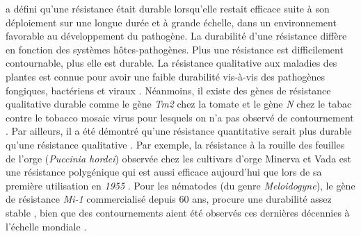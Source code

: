 	\citet{Johnson1984} a défini qu’une résistance était durable lorsqu’elle restait efficace suite à son déploiement sur une longue durée et à grande échelle, dans un environnement favorable au développement
du pathogène. %
La durabilité d’une résistance diffère  en fonction des systèmes hôtes-pathogènes. Plus une résistance est difficilement contournable, plus elle est durable.
La résistance qualitative aux maladies des plantes est connue pour avoir une faible durabilité vis-à-vis des pathogènes fongiques, bactériens et viraux \citep{Garcia-Arenal2003, Brown2015, Parlevliet2002}. Néanmoins, il existe des gènes de résistance qualitative durable comme le gène \textit{Tm2} chez la tomate et le gène \textit{N} chez le tabac contre le tobacco mosaic virus pour lesquels on n'a pas observé de contournement   \citep{Parlevliet2002}.
Par ailleurs, il a été démontré qu'une résistance quantitative serait plus durable qu'une résistance qualitative \citep{Mundt2014, Palloix2009}. Par exemple, la résistance à la rouille des feuilles de l'orge (\textit{Puccinia hordei}) observée chez les cultivars d'orge Minerva et Vada est une résistance  polygénique qui est aussi efficace aujourd'hui que lors de sa première utilisation en \textit{1955} \citep{Parlevliet2002}. 
Pour les nématodes (du genre \textit{Meloidogyne}), le
gène de résistance \textit{Mi-1} commercialisé depuis 60 ans, procure une durabilité assez stable \citep{Williamson2006}, bien que des contournements aient été observés ces dernières décennies à l'échelle mondiale  \citep{Castagnone-Sereno2002, Verdejo-Lucas2009,Seid2015}. 

